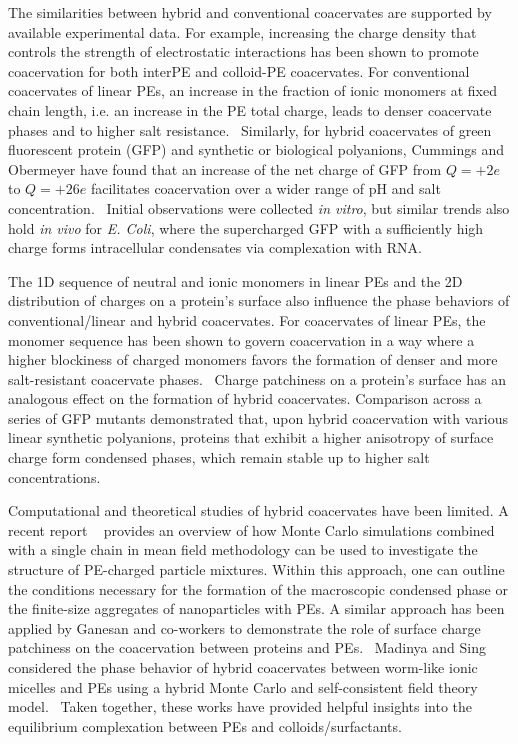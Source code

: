 \documentclass[journal=mamobx, manuscript=article]{achemso}
\begin{document}
The similarities between hybrid and conventional coacervates are supported by available experimental data. For example, increasing the charge density that controls the strength of electrostatic interactions has been shown to promote coacervation for both interPE and colloid-PE coacervates. For conventional coacervates of linear PEs, an increase in the fraction of ionic monomers at fixed chain length, i.e. an increase in the PE total charge, leads to denser coacervate phases and to higher salt resistance.~\cite{neitzel2021expanding} Similarly, for hybrid coacervates of green fluorescent protein (GFP) and synthetic or biological polyanions, Cummings and Obermeyer have found that an increase of the net charge of GFP from $Q = +2e$ to $Q = + 26e$ facilitates coacervation over a wider range of pH and salt concentration.~\cite{cummings2018phase} 
Initial observations were collected \textit{in vitro}, but similar trends
also hold \textit{in vivo} for \textit{E. Coli}, where the supercharged GFP with a sufficiently high charge forms intracellular condensates via complexation with RNA.~\cite{yeong2020formation}

The 1D sequence of neutral and ionic monomers in linear PEs and the 2D distribution of charges on a protein's surface also influence the phase behaviors of conventional/linear and hybrid coacervates. For coacervates of linear PEs, the monomer sequence has been shown to govern coacervation in a way where a higher blockiness of charged monomers favors the formation of denser and more salt-resistant coacervate phases.~\cite{rumyantsev2019controlling, yu2021complex, Sing-2017, lytle2019designing} Charge patchiness on a protein's surface has an analogous effect on the formation of hybrid coacervates. Comparison across a series of GFP mutants demonstrated that, upon hybrid coacervation with various linear synthetic polyanions, proteins that exhibit a higher anisotropy of surface charge form condensed phases, which remain stable up to higher salt concentrations.~\cite{kim2020effect}

Computational and theoretical studies of hybrid coacervates have been limited. A recent report ~ provides an overview of how Monte Carlo simulations combined with a single chain in mean field methodology can be used to investigate the structure of PE-charged particle mixtures. Within this approach, one can outline the conditions necessary for the formation of the macroscopic condensed phase or the finite-size aggregates of nanoparticles with PEs. A similar approach has been applied by Ganesan and co-workers to demonstrate the role of surface charge patchiness on the coacervation between proteins and PEs.~\cite{samanta2018influence,samanta2020influence,samanta2020direct} Madinya and Sing considered the phase behavior of hybrid coacervates between worm-like ionic micelles and PEs using a hybrid Monte Carlo and self-consistent field theory model.~\cite{madinya2022hybrid} Taken together, these works have provided helpful insights into the equilibrium complexation between PEs and colloids/surfactants.  
\end{document}
